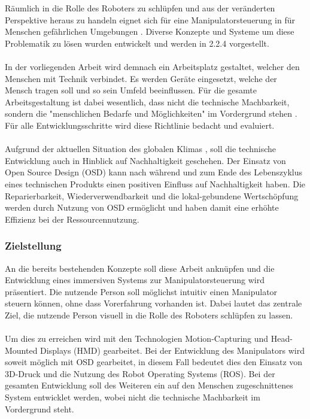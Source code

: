   Räumlich in die Rolle des Roboters zu schlüpfen und aus der veränderten Perspektive heraus zu handeln eignet sich für eine Manipulatorsteuerung in für Menschen gefährlichen Umgebungen \cite[S.9]{mareczek_grundlagen_2020}. Diverse Konzepte und Systeme um diese Problematik zu lösen wurden entwickelt und werden in 2.2.4 vorgestellt.\\\\
  In der vorliegenden Arbeit wird demnach ein Arbeitsplatz gestaltet, welcher den Menschen mit Technik verbindet. Es werden Geräte eingesetzt, welche der Mensch tragen soll und so sein Umfeld beeinflussen. Für die gesamte Arbeitsgestaltung ist dabei wesentlich, dass nicht die technische Machbarkeit, sondern die "menschlichen Bedarfe und Möglichkeiten" im Vordergrund stehen \cite{strater_positionspapier_2019}. Für alle Entwicklungsschritte wird diese Richtlinie bedacht und evaluiert.\\\\
  Aufgrund der aktuellen Situation des globalen Klimas \cite{ipcc_climate_2021}, soll die technische Entwicklung auch in Hinblick auf Nachhaltigkeit geschehen. Der Einsatz von Open Source Design (OSD) kann nach \cite{setchi_implications_2016} während und zum Ende des Lebenszyklus eines technischen Produkts einen positiven Einfluss auf Nachhaltigkeit haben. Die Reparierbarkeit, Wiederverwendbarkeit und die lokal-gebundene Wertschöpfung werden durch Nutzung von OSD ermöglicht und haben damit eine erhöhte Effizienz bei der Ressourcennutzung.
\subsubsection{Zielstellung} \label{1:sec:ziel}
  An die bereits bestehenden Konzepte soll diese Arbeit anknüpfen und die Entwicklung eines immersiven Systems zur Manipulatorsteuerung wird präsentiert. Die nutzende Person soll möglichst intuitiv einen Manipulator steuern können, ohne dass Vorerfahrung vorhanden ist. Dabei lautet das zentrale Ziel, die nutzende Person visuell in die Rolle des Roboters schlüpfen zu lassen. \\\\
  Um dies zu erreichen wird mit den Technologien Motion-Capturing und Head-Mounted Displays (HMD) gearbeitet. Bei der Entwicklung des Manipulators wird soweit möglich mit OSD gearbeitet, in diesem Fall bedeutet dies den Einsatz von 3D-Druck und die Nutzung des Robot Operating Systems (ROS). Bei der gesamten Entwicklung soll des Weiteren ein auf den Menschen zugeschnittenes System entwicklet werden, wobei nicht die technische Machbarkeit im Vordergrund steht.
